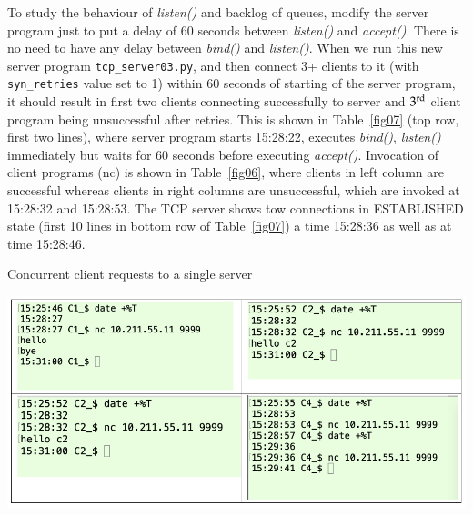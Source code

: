 \begin{multicols}{2}
To study the behaviour of \textit{listen()} and backlog of queues, modify the server program just to put a delay of 60 seconds between \textit{listen()} and \textit{accept()}. There is no need to have any delay between \textit{bind()} and \textit{listen()}. When we run this new server program \texttt{tcp\_server03.py}, and then connect 3+ clients to it (with \texttt{syn\_retries} value set to 1) within 60 seconds of starting of the server program, it should result in first two clients connecting successfully to server and $3^{\rm rd}$ client program being unsuccessful after retries. This is shown in Table~\ref{fig07} (top row, first two lines), where server program starts 15:28:22, executes \textit{bind()}, \textit{listen()} immediately but waits for 60 seconds before executing \textit{accept()}. Invocation of client programs (nc) is shown in Table~\ref{fig06}, where clients in left column are successful whereas clients in right columns are unsuccessful, which are invoked at 15:28:32 and 15:28:53. The TCP server shows tow connections in ESTABLISHED state (first 10 lines in bottom row of Table~\ref{fig07}) a time 15:28:36 as well as at time 15:28:46.
\end{multicols}


\begin{table}[H]
\centering
\caption{Concurrent client requests to a single server}\label{fig06}
\includegraphics[scale=2.26]{src/Figures/chap1/fig06.jpg}
\end{table}

